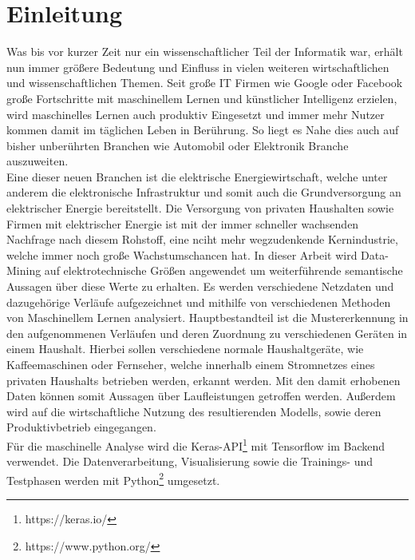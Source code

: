 \chapter{Einleitung}

    Was bis vor kurzer Zeit nur ein wissenschaftlicher Teil der Informatik war, erhält nun immer größere Bedeutung und Einfluss in vielen weiteren wirtschaftlichen und wissenschaftlichen Themen. 
    Seit große IT Firmen wie Google oder Facebook große Fortschritte mit maschinellem Lernen und künstlicher Intelligenz erzielen, wird maschinelles Lernen auch produktiv Eingesetzt und immer mehr Nutzer kommen damit im täglichen Leben in Berührung.
    So liegt es Nahe dies auch auf bisher unberührten Branchen wie Automobil oder Elektronik Branche auszuweiten.\\
    \newline
    Eine dieser neuen Branchen ist die elektrische Energiewirtschaft, welche unter anderem die elektronische Infrastruktur und somit auch die Grundversorgung an elektrischer Energie bereitstellt.
    Die Versorgung von privaten Haushalten sowie Firmen mit elektrischer Energie ist mit der immer schneller wachsenden Nachfrage nach diesem Rohstoff, eine nciht mehr wegzudenkende Kernindustrie, welche immer noch große Wachstumschancen hat.
    In dieser Arbeit wird Data-Mining auf elektrotechnische Größen angewendet um weiterführende semantische Aussagen über diese Werte zu erhalten. 
    Es werden verschiedene Netzdaten und dazugehörige Verläufe aufgezeichnet und mithilfe von verschiedenen Methoden von Maschinellem Lernen analysiert.
    Hauptbestandteil ist die Mustererkennung in den aufgenommenen Verläufen und deren Zuordnung zu verschiedenen Geräten in einem Haushalt. 
    Hierbei sollen verschiedene normale Haushaltgeräte, wie Kaffeemaschinen oder Fernseher, welche innerhalb einem Stromnetzes eines privaten Haushalts betrieben werden, erkannt werden.
    Mit den damit erhobenen Daten können somit Aussagen über Laufleistungen getroffen werden.
    Außerdem wird auf die wirtschaftliche Nutzung des resultierenden Modells, sowie deren Produktivbetrieb eingegangen.\\
    \newline
    Für die maschinelle Analyse wird die Keras-API\footnote{https://keras.io/} mit Tensorflow im Backend verwendet.
    Die Datenverarbeitung, Visualisierung sowie die Trainings- und Testphasen werden mit Python\footnote{https://www.python.org/} umgesetzt.
